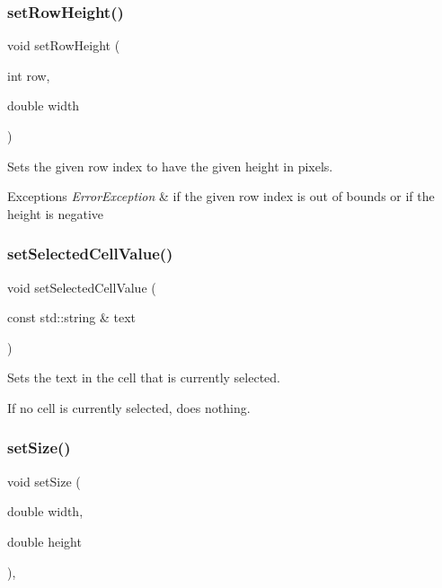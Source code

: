 \subsubsection{\texorpdfstring{set\+Row\+Height()}{setRowHeight()}}
{\footnotesize\ttfamily void set\+Row\+Height (\begin{DoxyParamCaption}\item[{int}]{row,  }\item[{double}]{width }\end{DoxyParamCaption})\hspace{0.3cm}{\ttfamily [virtual]}}



Sets the given row index to have the given height in pixels. 


\begin{DoxyExceptions}{Exceptions}
{\em Error\+Exception} & if the given row index is out of bounds or if the height is negative \\
\hline
\end{DoxyExceptions}
\mbox{\label{classsgl_1_1GTable_a3120b24ea5aaa17d8a7192742c00bcfb}} 
\subsubsection{\texorpdfstring{set\+Selected\+Cell\+Value()}{setSelectedCellValue()}}
{\footnotesize\ttfamily void set\+Selected\+Cell\+Value (\begin{DoxyParamCaption}\item[{const std\+::string \&}]{text }\end{DoxyParamCaption})\hspace{0.3cm}{\ttfamily [virtual]}}



Sets the text in the cell that is currently selected. 

If no cell is currently selected, does nothing. \mbox{\label{classsgl_1_1GInteractor_aca25d49481f9bf5fc8f7df4c086c4ce7}} 
\subsubsection{\texorpdfstring{set\+Size()}{setSize()}\hspace{0.1cm}{\footnotesize\ttfamily [1/2]}}
{\footnotesize\ttfamily void set\+Size (\begin{DoxyParamCaption}\item[{double}]{width,  }\item[{double}]{height }\end{DoxyParamCaption})\hspace{0.3cm}{\ttfamily [virtual]}, {\ttfamily [inherited]}}



